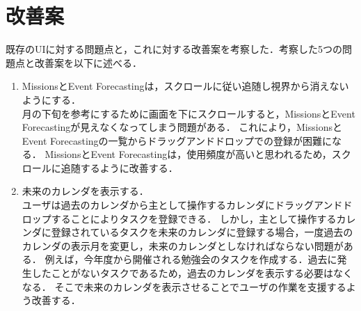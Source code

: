 \documentclass[fleqn, 14pt]{extarticlej}
\begin{document}
\newpage
\section{改善案}
既存のUIに対する問題点と，これに対する改善案を考察した．考察した5つの問題点と改善案を以下に述べる．

\begin{enumerate}
	\item MissionsとEvent Forecastingは，スクロールに従い追随し視界から消えないようにする．\\
月の下旬を参考にするために画面を下にスクロールすると，MissionsとEvent Forecastingが見えなくなってしまう問題がある．
これにより，MissionsとEvent Forecastingの一覧からドラッグアンドドロップでの登録が困難になる．
MissionsとEvent Forecastingは，使用頻度が高いと思われるため，スクロールに追随するように改善する．\\
	

	
	\item 未来のカレンダを表示する．\\
ユーザは過去のカレンダから主として操作するカレンダにドラッグアンドドロップすることによりタスクを登録できる．
しかし，主として操作するカレンダに登録されているタスクを未来のカレンダに登録する場合，一度過去のカレンダの表示月を変更し，未来のカレンダとしなければならない問題がある．
例えば，今年度から開催される勉強会のタスクを作成する．過去に発生したことがないタスクであるため，過去のカレンダを表示する必要はなくなる．
そこで未来のカレンダを表示させることでユーザの作業を支援するよう改善する．



\end{enumerate}
\end{document}
